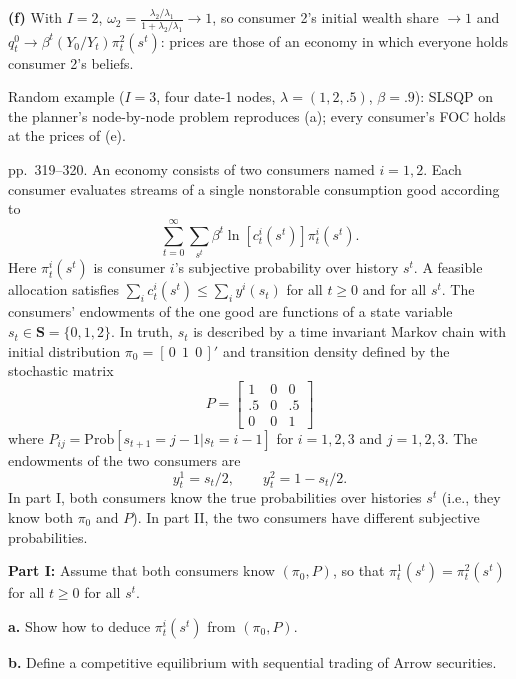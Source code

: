\documentclass[12pt, letterpaper]{article}
\begin{document}
\begin{tcolorbox}[evenbox,title={Exercise 8.16 \quad Diverse beliefs, II}]
\textbf{(f)} With $I=2$, $\omega_2=\frac{\lambda_2/\lambda_1}{1+\lambda_2/\lambda_1}\to1$, so consumer 2's initial wealth share
$\to1$ and $q^0_t\to\beta^t(Y_0/Y_t)\pi^2_t(s^t)$: prices are those of an economy in which everyone holds consumer
2's beliefs.

\begin{tcolorbox}[databox]
Random example ($I=3$, four date-1 nodes, $\lambda=(1,2,.5)$, $\beta=.9$): SLSQP on the planner's node-by-node problem
reproduces (a); every consumer's FOC holds at the prices of (e).
\end{tcolorbox}
\end{tcolorbox}

\begin{tcolorbox}[oddbox,title={Exercise 8.17 \quad Diverse beliefs, III}]
\begin{tcolorbox}[questionbox]
pp.~319--320. An economy consists of two consumers named $i=1,2$. Each consumer evaluates streams of a
single nonstorable consumption good according to
\[
\sum_{t=0}^\infty\sum_{s^t}\beta^t\ln[c^i_t(s^t)]\pi^i_t(s^t).
\]
Here $\pi^i_t(s^t)$ is consumer $i$'s subjective probability over history $s^t$. A feasible allocation satisfies
$\sum_ic^i_t(s^t)\le\sum_iy^i(s_t)$ for all $t\ge0$ and for all $s^t$. The consumers' endowments of the one good are
functions of a state variable $s_t\in\mathbf S=\{0,1,2\}$. In truth, $s_t$ is described by a time invariant
Markov chain with initial distribution $\pi_0=[\,0\ \ 1\ \ 0\,]'$ and transition density defined by the
stochastic matrix
\[
P=\begin{bmatrix}1&0&0\\.5&0&.5\\0&0&1\end{bmatrix}
\]
where $P_{ij}=\mathrm{Prob}[s_{t+1}=j-1|s_t=i-1]$ for $i=1,2,3$ and $j=1,2,3$. The endowments of the two
consumers are
\[
y^1_t=s_t/2,\qquad y^2_t=1-s_t/2.
\]
In part I, both consumers know the true probabilities over histories $s^t$ (i.e., they know both $\pi_0$ and
$P$). In part II, the two consumers have different subjective probabilities.

\textbf{Part I:} Assume that both consumers know $(\pi_0,P)$, so that $\pi^1_t(s^t)=\pi^2_t(s^t)$ for all $t\ge0$ for
all $s^t$.

\textbf{a.} Show how to deduce $\pi^i_t(s^t)$ from $(\pi_0,P)$.

\textbf{b.} Define a competitive equilibrium with sequential trading of Arrow securities.


\end{tcolorbox}
\end{tcolorbox}
\end{document}
